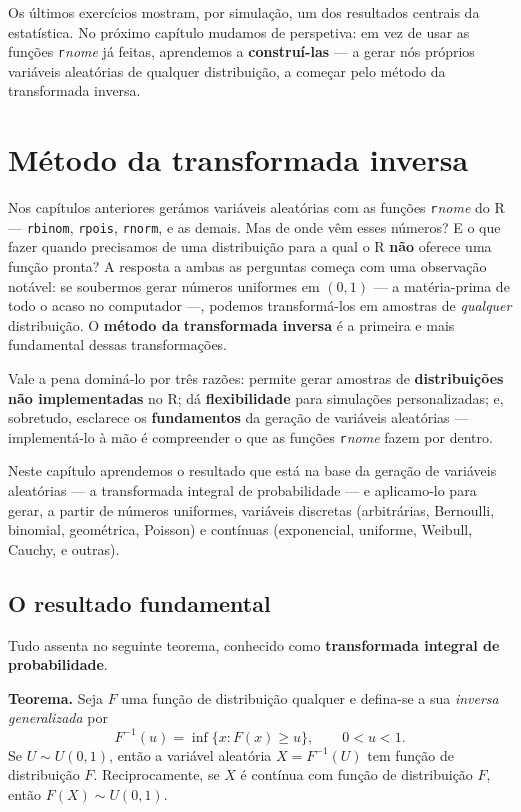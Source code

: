 \documentclass[
  portuguese,
  11pt,
  openany]{book}
\begin{document}
Os últimos exercícios mostram, por simulação, um dos resultados centrais da estatística.
No próximo capítulo mudamos de perspetiva: em vez de usar as funções \texttt{r}\emph{nome} já feitas,
aprendemos a \textbf{construí-las} --- a gerar nós próprios variáveis aleatórias de qualquer
distribuição, a começar pelo método da transformada inversa.

\chapter{Método da transformada inversa}\label{transformada}

Nos capítulos anteriores gerámos variáveis aleatórias com as funções \texttt{r}\emph{nome} do R ---
\texttt{rbinom}, \texttt{rpois}, \texttt{rnorm}, e as demais. Mas de onde vêm esses números? E o que fazer
quando precisamos de uma distribuição para a qual o R \textbf{não} oferece uma função pronta?
A resposta a ambas as perguntas começa com uma observação notável: se soubermos gerar
números uniformes em \((0, 1)\) --- a matéria-prima de todo o acaso no computador ---, podemos
transformá-los em amostras de \emph{qualquer} distribuição. O \textbf{método da transformada
inversa} é a primeira e mais fundamental dessas transformações.

Vale a pena dominá-lo por três razões: permite gerar amostras de \textbf{distribuições não
implementadas} no R; dá \textbf{flexibilidade} para simulações personalizadas; e, sobretudo,
esclarece os \textbf{fundamentos} da geração de variáveis aleatórias --- implementá-lo à mão é
compreender o que as funções \texttt{r}\emph{nome} fazem por dentro.

Neste capítulo aprendemos o resultado que está na base da geração de variáveis
aleatórias --- a transformada integral de probabilidade --- e aplicamo-lo para gerar, a
partir de números uniformes, variáveis discretas (arbitrárias, Bernoulli, binomial,
geométrica, Poisson) e contínuas (exponencial, uniforme, Weibull, Cauchy, e outras).

\section{O resultado fundamental}\label{o-resultado-fundamental}

Tudo assenta no seguinte teorema, conhecido como \textbf{transformada integral de
probabilidade}.

\textbf{Teorema.} Seja \(F\) uma função de distribuição qualquer e defina-se a sua \emph{inversa
generalizada} por
\[F^{-1}(u) = \inf\{x : F(x) \geq u\}, \qquad 0 < u < 1.\]
Se \(U \sim U(0, 1)\), então a variável aleatória \(X = F^{-1}(U)\) tem função de
distribuição \(F\). Reciprocamente, se \(X\) é contínua com função de distribuição \(F\),
então \(F(X) \sim U(0, 1)\).
\end{document}
